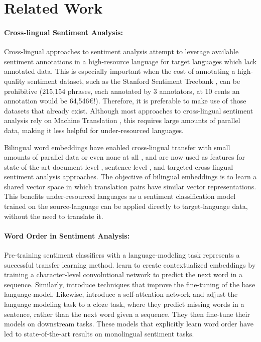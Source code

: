 \documentclass[a4paper,11pt,twocolumn,twoside]{article}
\begin{document}
\section{Related Work}

\paragraph{Cross-lingual Sentiment Analysis: }

Cross-lingual approaches to sentiment analysis attempt to leverage available sentiment annotations in a high-resource language for target languages which lack annotated data. This is especially important when the cost of annotating a high-quality sentiment dataset, such as the Stanford Sentiment Treebank  \cite{Socher2013b}, can be prohibitive (215,154 phrases, each annotated by 3 annotators, at 10 cents an annotation would be 64,546€!). Therefore, it is preferable to make use of those datasets that already exist. Although most approaches to cross-lingual sentiment analysis rely on Machine Translation \cite{Banea2008,Balahur2014d,Klinger2015}, this requires large amounts of parallel data,
making it less helpful for under-resourced languages.


Bilingual word embeddings have enabled cross-lingual transfer with small amounts of parallel data \cite{Artetxe2017,Lample2017} or even none at all \cite{lample2018unsupervised,Artetxe2018}, and are now used as features for state-of-the-art document-level \cite{Chen2016}, sentence-level \cite{Barnes2018b}, and targeted \cite{Hangya2018} cross-lingual sentiment analysis approaches. The objective of bilingual embeddings is to learn a shared vector space in which translation pairs have similar vector representations. This benefits under-resourced languages as a sentiment classification model trained on the source-language can be applied directly to target-language data, without the need to translate it.


\paragraph{Word Order in Sentiment Analysis: }

Pre-training sentiment classifiers with a language-modeling task represents a successful transfer learning method.  learn
to create contextualized embeddings by training a character-level convolutional
network to predict the next word in a sequence. Similarly,  introduce techniques that improve the fine-tuning of the base language-model. Likewise, 
 introduce a self-attention network and adjust the language
modeling task to a cloze task, where they predict missing words in a sentence, rather than the next word given a sequence. They then fine-tune their models on downstream tasks. These models that explicitly learn word order have led to state-of-the-art results on monolingual sentiment tasks.
\end{document}
